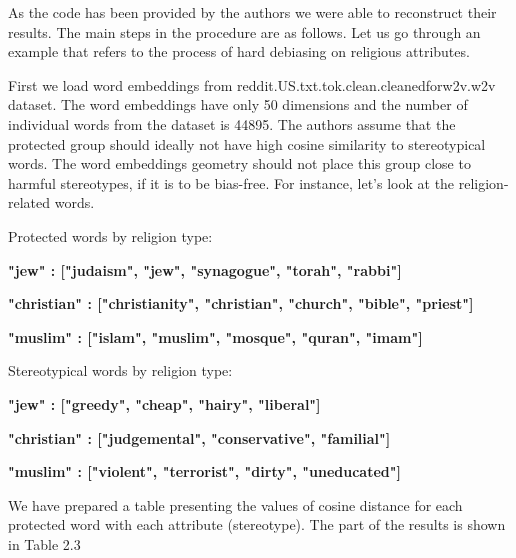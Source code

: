 \documentclass[12pt,]{book}
\begin{document}
As the code has been provided by the authors we were able to reconstruct
their results. The main steps in the procedure are as follows. Let us go
through an example that refers to the process of hard debiasing on
religious attributes.

First we load word embeddings from
reddit.US.txt.tok.clean.cleanedforw2v.w2v dataset. The word embeddings
have only 50 dimensions and the number of individual words from the
dataset is 44895. The authors assume that the protected group should
ideally not have high cosine similarity to stereotypical words. The word
embeddings geometry should not place this group close to harmful
stereotypes, if it is to be bias-free. For instance, let's look at the
religion-related words.

Protected words by religion type:

\begin{minipage}{1.0\textwidth}
\textbf{"jew"       : ["judaism", "jew", "synagogue", "torah", "rabbi"]} 

\textbf{"christian" : ["christianity", "christian", "church", "bible", "priest"]}

\textbf{"muslim"    : ["islam", "muslim", "mosque", "quran", "imam"]}
\end{minipage}

Stereotypical words by religion type:

\begin{minipage}{1.0\textwidth}
\textbf{"jew"       : ["greedy", "cheap", "hairy", "liberal"]}

\textbf{"christian"       : ["judgemental", "conservative", "familial"]}

\textbf{"muslim"       : ["violent", "terrorist", "dirty", "uneducated"]}
\end{minipage}

We have prepared a table presenting the values of cosine distance for
each protected word with each attribute (stereotype). The part of the
results is shown in Table 2.3

\footnotesize 
\end{document}
